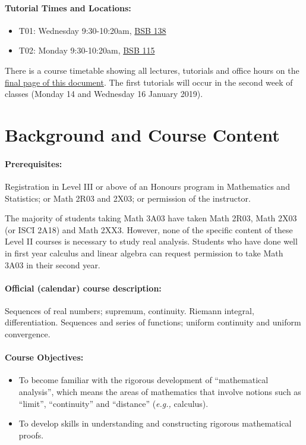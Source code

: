 \documentclass[12pt]{article}
\newcommand{\eg}{\emph{e.g.,\/}\xspace}
\begin{document}
\paragraph*{Tutorial Times and Locations:}
\begin{itemize}\addtolength{\itemsep}{-0.75\baselineskip}
\item T01: Wednesday 9:30-10:20am, \href{https://library.mcmaster.ca/spaces/cct}{BSB 138}
\item T02: Monday 9:30-10:20am, \href{https://library.mcmaster.ca/spaces/cct}{BSB 115}
\end{itemize}

\noindent
There is a course timetable showing all lectures, tutorials and office
hours on the \hyperlink{timetable}{final page of this document}.
The first tutorials will occur in the second week of classes
(Monday 14 and Wednesday 16 January 2019).

\section*{Background and Course Content}

\paragraph*{Prerequisites:} Registration in Level III or above of an Honours program in Mathematics and Statistics; or Math 2R03 and 2X03; or permission of the instructor.

The majority of students taking Math 3A03 have taken Math 2R03, Math 2X03 (or ISCI 2A18) and Math 2XX3.  However, none of the specific content of these Level II courses is necessary to study real analysis.  Students who have done well in first year calculus and linear algebra can request permission to take Math 3A03 in their second year.

\paragraph*{Official (calendar) course description:}
Sequences of real numbers; supremum, continuity. Riemann integral, differentiation. Sequences and series of functions; uniform continuity and uniform convergence.

\paragraph*{Course Objectives:}

\begin{itemize}
\item To become familiar with the rigorous development of ``mathematical analysis'', which means the areas of mathematics that involve notions such as ``limit'', ``continuity'' and ``distance'' (\eg calculus).
\item To develop skills in understanding and constructing rigorous mathematical proofs.
\end{itemize}
\end{document}
